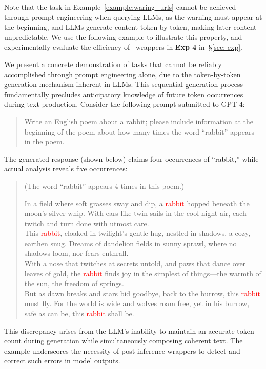 Note that the task in Example~\ref{example:waring_urls} cannot be achieved through prompt engineering when querying LLMs, as the warning must appear at the beginning, and LLMs generate content token by token, making later content unpredictable.
We use the following example to illustrate this property, and experimentally evaluate the efficiency of \customization~wrappers in \textbf{Exp 4} in~\S\ref{sec: exp}. 


\begin{example}
\label{ex:llm-limitation}
We present a concrete demonstration of tasks that cannot be reliably accomplished through prompt engineering alone, due to the token-by-token generation mechanism inherent in LLMs. This sequential generation process fundamentally precludes anticipatory knowledge of future token occurrences during text production.
Consider the following prompt submitted to GPT-4:



\begingroup
{
\begin{quote}
\ttfamily
\noindent Write an English poem about a rabbit; please include information at the beginning of the poem about how many times the word ``rabbit'' appears in the poem.
\end{quote}
}
\endgroup

The generated response (shown below) claims four occurrences of ``rabbit,'' while actual analysis reveals five occurrences:
\begingroup
{ 
\begin{quote}
\ttfamily
(The word ``rabbit'' appears 4 times in this poem.) 

In a field where soft grasses sway and dip, 
a \textcolor{red}{rabbit} hopped beneath the moon's silver whip. 
With ears like twin sails in the cool night air, 
each twitch and turn done with utmost care. \\

This \textcolor{red}{rabbit}, cloaked in twilight's gentle hug, 
nestled in shadows, a cozy, earthen snug. 
Dreams of dandelion fields in sunny sprawl, 
where no shadows loom, nor fears enthrall. \\

With a nose that twitches at secrets untold, 
and paws that dance over leaves of gold, 
the \textcolor{red}{rabbit} finds joy in the simplest of things—the warmth of the sun, the freedom of springs. \\

But as dawn breaks and stars bid goodbye, 
back to the burrow, this \textcolor{red}{rabbit} must fly. 
For the world is wide and wolves roam free,
yet in his burrow, safe as can be, this \textcolor{red}{rabbit} shall be.
\end{quote}
}
\endgroup

This discrepancy arises from the LLM's inability to maintain an accurate token count during generation while simultaneously composing coherent text. The example underscores the necessity of post-inference wrappers to detect and correct such errors in model outputs.
\end{example}






